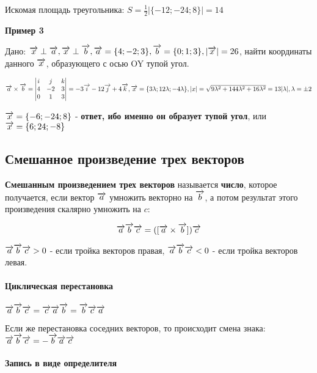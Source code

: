 \documentclass{article}
\def\vec{\ensuremath\overrightarrow}
\begin{document}
\begin{flushleft}
Искомая площадь треугольника: $S = \frac{1}{2} |\{ -12; -24; 8 \}| = 14$

\hfill

\textbf{Пример 3}

Дано: $\vec{x} \perp \vec{a}, \vec{x} \perp \vec{b}, \vec{a} = \{ 4; -2; 3\}, \vec{b} = \{ 0; 1; 3 \}, |\vec{x}| = 26$, найти координаты данного $\vec{x}$, образующего с осью OY тупой угол.

$\vec{a} \times \vec{b} = \begin{vmatrix}
    i & j & k \\
    4 & -2 & 3 \\
    0 & 1 & 3
\end{vmatrix} = -3\vec{i} - 12\vec{j} + 4\vec{k}, \vec{x} = \{ 3 \lambda; 12 \lambda; -4 \lambda \}, |x| = \sqrt{9\lambda^2 + 144\lambda^2 + 16\lambda^2} = 13|\lambda|, \lambda = \pm 2$

$\vec{x} = \{ -6; -24; 8 \}$ - \textbf{ответ, ибо именно он образует тупой угол}, или $\vec{x} = \{ 6; 24; -8 \}$

\subsection{Смешанное произведение трех векторов}

\textbf{Смешанным произведением трех векторов} называется \textbf{число}, которое получается, если вектор $\vec{a}$ умножить векторно на $\vec{b}$, а потом результат этого произведения скалярно умножить на $c$:

$$\vec{a} \vec{b} \vec{c} = ([\vec{a} \times \vec{b}]) \vec{c}$$

$\vec{a} \vec{b} \vec{c} > 0$ - если тройка векторов правая, $\vec{a} \vec{b} \vec{c} < 0$ - если тройка векторов левая.

\paragraph{Циклическая перестановка}

$\vec{a} \vec{b} \vec{c} = \vec{c} \vec{a} \vec{b} = \vec{b} \vec{c} \vec{a}$

Если же перестановка соседних векторов, то происходит смена знака: $\vec{a} \vec{b} \vec{c} = - \vec{b} \vec{a} \vec{c}$

\paragraph{Запись в виде определителя}


\end{flushleft}
\end{document}
